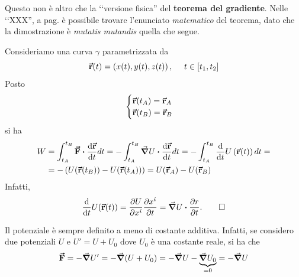 \begin{observe}
	Questo non è altro che la ‘‘versione fisica''  del \textbf{teorema del gradiente}. Nelle ‘‘XXX'', a pag. \pageref{thmgradiente} è possibile trovare l'enunciato \textit{matematico} del teorema, dato che la dimostrazione è \textit{mutatis mutandis} quella che segue.
\end{observe}
\begin{demonstration}
	Consideriamo una curva $\gamma$ parametrizzata da
	\begin{equation*}
		\vb*{\va{r}}(t)=\left(x(t),y(t),z(t)\right),\ \quad t\in\left[t_1,t_2\right]
	\end{equation*}
	Posto
	\begin{equation*}
		\begin{cases}
			\vb*{\va{r}}(t_A)=\vb*{\va{r}}_A\\
			\vb*{\va{r}}(t_B)=\vb*{\va{r}}_B
		\end{cases}
	\end{equation*}
si ha
\begin{align*}
	W&=\int_{t_A}^{t_B}\vba{F}\vdot\dv{\vba{r}}{t}dt=-\int_{t_A}^{t_B}\grad{U}\vdot\dv{\vba{r}}{t}dt=-\int_{t_A}^{t_B}\dv{t}U\left(\vba{r}(t)\right)dt=\\
	&=-\left(U(\vba{r}(t_B))-U(\vba{r}(t_A))\right)=U(\vba{r}_A)-U(\vba{r}_B)
\end{align*}
Infatti,
\begin{equation*}
	\dv{t}U(\vba{r}(t))=\pdv{U}{x^i}\pdv{x^i}{t}=\grad{U}\vdot\pdv{r}{t}.\qedhere
\end{equation*}
\end{demonstration}
\begin{observe}
	Il potenziale è sempre definito a meno di costante additiva. Infatti, se considero due potenziali $U$ e $U'=U+U_0$ dove $U_0$ è una costante reale, si ha che
	\begin{equation*}
		\vb*{\va{F}}=-\grad{U'}=-\grad{(U+U_0)}=-\grad{U}-\underbrace{\grad{U_0}}_{=0}=-\grad{U}
	\end{equation*}
\end{observe}
